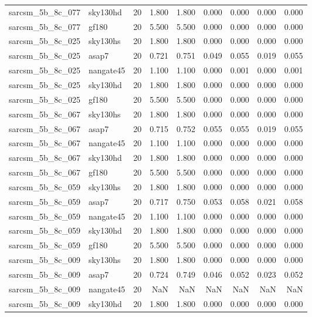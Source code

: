 \begin{tabular}{llrrrrrrr}
sarcsm\_5b\_8c\_077 & sky130hd & 20 & 1.800 & 1.800 & 0.000 & 0.000 & 0.000 & 0.000 \\
sarcsm\_5b\_8c\_077 & gf180 & 20 & 5.500 & 5.500 & 0.000 & 0.000 & 0.000 & 0.000 \\
sarcsm\_5b\_8c\_025 & sky130hs & 20 & 1.800 & 1.800 & 0.000 & 0.000 & 0.000 & 0.000 \\
sarcsm\_5b\_8c\_025 & asap7 & 20 & 0.721 & 0.751 & 0.049 & 0.055 & 0.019 & 0.055 \\
sarcsm\_5b\_8c\_025 & nangate45 & 20 & 1.100 & 1.100 & 0.000 & 0.001 & 0.000 & 0.001 \\
sarcsm\_5b\_8c\_025 & sky130hd & 20 & 1.800 & 1.800 & 0.000 & 0.000 & 0.000 & 0.000 \\
sarcsm\_5b\_8c\_025 & gf180 & 20 & 5.500 & 5.500 & 0.000 & 0.000 & 0.000 & 0.000 \\
sarcsm\_5b\_8c\_067 & sky130hs & 20 & 1.800 & 1.800 & 0.000 & 0.000 & 0.000 & 0.000 \\
sarcsm\_5b\_8c\_067 & asap7 & 20 & 0.715 & 0.752 & 0.055 & 0.055 & 0.019 & 0.055 \\
sarcsm\_5b\_8c\_067 & nangate45 & 20 & 1.100 & 1.100 & 0.000 & 0.000 & 0.000 & 0.000 \\
sarcsm\_5b\_8c\_067 & sky130hd & 20 & 1.800 & 1.800 & 0.000 & 0.000 & 0.000 & 0.000 \\
sarcsm\_5b\_8c\_067 & gf180 & 20 & 5.500 & 5.500 & 0.000 & 0.000 & 0.000 & 0.000 \\
sarcsm\_5b\_8c\_059 & sky130hs & 20 & 1.800 & 1.800 & 0.000 & 0.000 & 0.000 & 0.000 \\
sarcsm\_5b\_8c\_059 & asap7 & 20 & 0.717 & 0.750 & 0.053 & 0.058 & 0.021 & 0.058 \\
sarcsm\_5b\_8c\_059 & nangate45 & 20 & 1.100 & 1.100 & 0.000 & 0.000 & 0.000 & 0.000 \\
sarcsm\_5b\_8c\_059 & sky130hd & 20 & 1.800 & 1.800 & 0.000 & 0.000 & 0.000 & 0.000 \\
sarcsm\_5b\_8c\_059 & gf180 & 20 & 5.500 & 5.500 & 0.000 & 0.000 & 0.000 & 0.000 \\
sarcsm\_5b\_8c\_009 & sky130hs & 20 & 1.800 & 1.800 & 0.000 & 0.000 & 0.000 & 0.000 \\
sarcsm\_5b\_8c\_009 & asap7 & 20 & 0.724 & 0.749 & 0.046 & 0.052 & 0.023 & 0.052 \\
sarcsm\_5b\_8c\_009 & nangate45 & 20 & NaN & NaN & NaN & NaN & NaN & NaN \\
sarcsm\_5b\_8c\_009 & sky130hd & 20 & 1.800 & 1.800 & 0.000 & 0.000 & 0.000 & 0.000 \\

\end{tabular}
